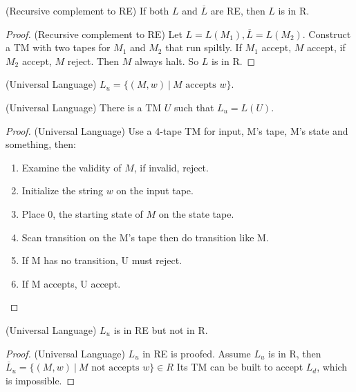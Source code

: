         \begin{theorem}
            (Recursive complement to RE) If both $L$ and $\overline{L}$ are RE, then $L$ is in R.
        \end{theorem}
        \begin{proof}
            (Recursive complement to RE) Let $L=L\left( M_{1} \right) ,\overline{L}=L\left( M_{2} \right) $. Construct a TM with two tapes for $M_1$ and $M_2$ that run spiltly. If $M_1$ accept, $M$ accept, if $M_2$ accept, $M$ reject. Then $M$ always halt. So $L$ is in R.
        \end{proof}
        \begin{definition}
            (Universal Language) $L_{u}=\{\left( M,w \right) \ |\ M\text{ accepts }w\}$.
        \end{definition}
        \begin{theorem}
            (Universal Language) There is a TM $U$ such that $L_{u}=L\left( U \right) $.
        \end{theorem}
        \begin{proof}
            (Universal Language) Use a 4-tape TM for input, M's tape, M's state and something, then:
            \begin{enumerate}
                \item Examine the validity of $M$, if invalid, reject.
                \item Initialize the string $w$ on the input tape.
                \item Place $0$, the starting state of $M$ on the state tape.
                \item Scan transition on the M's tape then do transition like M.
                \item If M has no transition, U must reject.
                \item If M accepts, U accept.
            \end{enumerate}
        \end{proof}
        \begin{theorem}
            (Universal Language) $L_{u}$ is in RE but not in R.
        \end{theorem}
        \begin{proof}
            (Universal Language) $L_{u}$ in RE is proofed. Assume $L_{u}$ is in R, then $\overline{L}_{u}=\{\left( M,w \right) \ |\ M\text{ not accepts }w\}\in R$ Its TM can be built to accept $L_{d}$, which is impossible.
        \end{proof}
